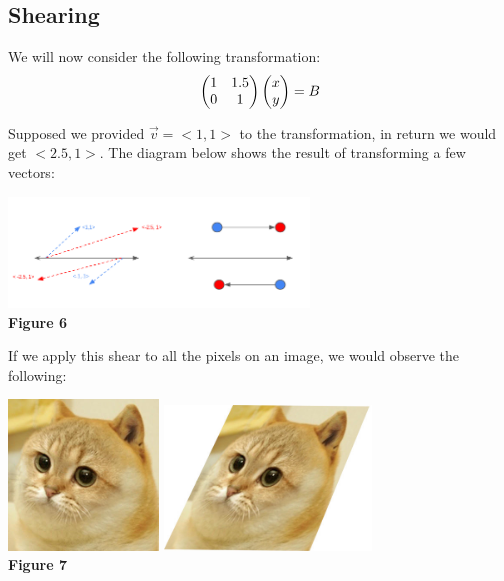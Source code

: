 \documentclass{article}
\begin{document}
\subsection {Shearing}
\par \noindent We will now consider the following transformation:
\[
\left(\begin{array}{@{}cc@{}}
	1 & 1.5 \\
	0 & 1\\
\end{array}\right)
\left(\begin{array}{@{}c@{}}
	x \\
	y \\
\end{array}\right)= B
\]

\par \noindent Supposed we provided \(\vec v = <1,1>\) to the transformation, in return we would get \(<2.5,1>\). The diagram below shows the result of transforming a few vectors:

\begin{center}
	\includegraphics[width=8cm]{shear.png}\\
	\textbf{Figure 6}
\end{center}

\par\noindent If we apply this shear to all the pixels on an image, we would observe the following:

\begin{center}
	\includegraphics[width=4cm]{cate-original.jpg}
	\includegraphics[width=5.5cm]{cate-sheared.jpg}\\
	\textbf{Figure 7}
\end{center}
\end{document}
